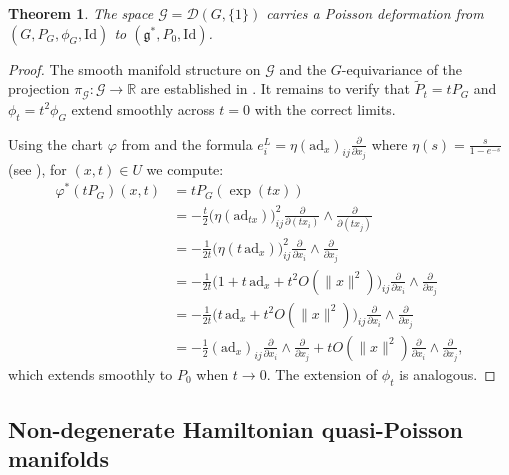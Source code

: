 \documentclass[reqno]{amsart}
\theoremstyle{plain}
\newtheorem{Thm}{Theorem}[section]
\theoremstyle{definition}
\newcommand{\too}{\longrightarrow}
\begin{document}
\begin{Thm}\label{thm:group-deformation}
The space $\mathcal{G} = \mathcal{D}(G, \{1\})$ carries a Poisson deformation from $(G,P_G,\phi_G,\mathrm{Id})$ to $(\mathfrak{g}^{*}, P_{0}, \mathrm{Id})$.
\end{Thm}

\begin{proof}
The smooth manifold structure on $\mathcal{G}$ and the $G$-equivariance of the projection $\pi_{\mathcal{G}}: \mathcal{G} \to \mathbb{R}$ are established in \cite[Theorem~4.1]{JMM2025deformations}. It remains to verify that $\tilde{P}_{t} = tP_{G}$ and $\phi_t = t^2\phi_G$ extend smoothly across $t=0$ with the correct limits.

Using the chart $\varphi$ from \cite[Lemma~2.1]{JMM2025deformations} and the formula $e^{L}_{i} = \eta(\mathrm{ad}_{x})_{ij}\frac{\partial}{\partial x_{j}}$ where $\eta(s) = \frac{s}{1-e^{-s}}$ (see \cite{alekseev2002quasi}), for $(x,t)\in U$ we compute:
\begin{align*}
\varphi^{*}(tP_{G})(x,t) &= tP_{G}(\exp(tx))\\
&= -\frac{t}{2}\bigl(\eta(\mathrm{ad}_{tx})\bigr)^{2}_{ij}\frac{\partial}{\partial(tx_{i})} \wedge \frac{\partial}{\partial(tx_{j})}\\
&= -\frac{1}{2t}\bigl(\eta(t\,\mathrm{ad}_{x})\bigr)^{2}_{ij} \frac{\partial}{\partial x_{i}} \wedge \frac{\partial}{\partial x_{j}}\\
&= -\frac{1}{2t}\bigl(1 + t\,\mathrm{ad}_{x} + t^{2}O(\|x\|^{2})\bigr)_{ij}\frac{\partial}{\partial x_{i}} \wedge \frac{\partial}{\partial x_{j}}\\
&= -\frac{1}{2t}\bigl(t\,\mathrm{ad}_{x} + t^{2}O(\|x\|^{2})\bigr)_{ij} \frac{\partial}{\partial x_{i}}\wedge \frac{\partial}{\partial x_{j}}\\
&= -\frac{1}{2}(\mathrm{ad}_{x})_{ij}\frac{\partial}{\partial x_{i}}\wedge \frac{\partial}{\partial x_{j}} + tO(\|x\|^{2})\frac{\partial}{\partial x_{i}}\wedge \frac{\partial}{\partial x_{j}},
\end{align*}
which extends smoothly to $P_0$ when $t \too 0.$ The extension of $\phi_t$ is analogous.
\end{proof}






\subsection{Non-degenerate Hamiltonian quasi-Poisson manifolds}\label{non-degen}
\end{document}
